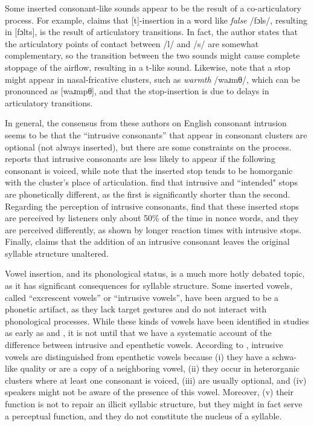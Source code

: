 \documentclass[output=paper,colorlinks,citecolor=brown]{langscibook}
\begin{document}
Some inserted consonant-like sounds appear to be the result of a co\hyp articulatory process. For example, \citet[359]{Ohala1974} claims that [t]-insertion in a word like \textit{false} /fɔls/, resulting in [fɔlts], is the result of articulatory transitions. In fact, the author states that the articulatory points of contact between /l/ and /s/ are somewhat complementary, so the transition between the two sounds might cause complete stoppage of the airflow, resulting in a t-like sound. Likewise, \citet{Alietal1979} note that a stop might appear in nasal-fricative clusters, such as \textit{warmth} /waɹmθ/, which can be pronounced as [waɹmpθ], and that the stop-insertion is due to delays in articulatory transitions. 

In general, the consensus from these authors on English consonant intrusion seems to be that the “intrusive consonants” that appear in consonant clusters are optional (not always inserted), but there are some constraints on the process. \citet{Ohala1974} reports that intrusive consonants are less likely to appear if the following consonant is voiced, while \citet{Alietal1979} note that the inserted stop tends to be homorganic with the cluster’s place of articulation. \citet{FourakisPort1986} find that intrusive and ``intended" stops are phonetically different, as the first is significantly shorter than the second. Regarding the perception of intrusive consonants, \citet{WarnerWeber2001} find that these inserted stops are perceived by listeners only about 50\% of the time in nonce words, and they are perceived differently, as shown by longer reaction times with intrusive stops. Finally, \citet{Wetzels1985} claims that the addition of an intrusive consonant leaves the original syllable structure unaltered.

Vowel insertion, and its phonological status, is a much more hotly debated topic, as it has significant consequences for syllable structure. Some inserted vowels, called “excrescent vowels” or “intrusive vowels”, have been argued to be a phonetic artifact, as they lack target gestures and do not interact with phonological processes. While these kinds of vowels have been identified in studies as early as \citet{MattesonPike1958} and \citet{Levin1987}, it is not until \citet{Hall2004, Hall2006, Hall2011} that we have a systematic account of the difference between intrusive and epenthetic vowels. According to \citet{Hall2006}, intrusive vowels are distinguished from epenthetic vowels because (i) they have a schwa-like quality or are a copy of a neighboring vowel, (ii) they occur in heterorganic clusters where at least one consonant is voiced, (iii) are usually optional, and (iv) speakers might not be aware of the presence of this vowel. Moreover, (v) their function is not to repair an illicit syllabic structure, but they might in fact serve a perceptual function, and they do not constitute the nucleus of a syllable.
\end{document}
